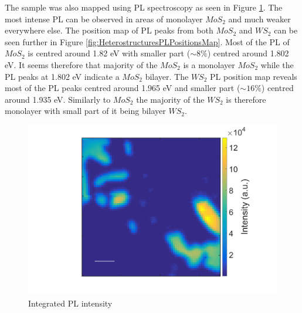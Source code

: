 The sample was also mapped using PL spectroscopy as seen in Figure \ref{fig:HeterostructuresPLIntensityMap11}. The most intense PL can be observed in areas of monolayer $MoS_2$ and much weaker everywhere else. The position map of PL peaks from both $MoS_2$ and $WS_2$ can be seen further in Figure \ref{fig:HeterostructuresPLPositionsMap}. Most of the PL of $MoS_2$ is centred around 1.82 eV with smaller part ($\sim 8 \%$) centred around 1.802 eV. It seems therefore that majority of the $MoS_2$ is a monolayer $MoS_2$ while the PL peaks at 1.802 eV indicate a $MoS_2$ bilayer. The $WS_2$ PL position map reveals most of the PL peaks centred around 1.965 eV and smaller part ($\sim 16 \%$) centred around 1.935 eV. Similarly to $MoS_2$ the majority of the $WS_2$ is therefore monolayer with small part of it being bilayer $WS_2$.

\begin{figure}[h]
	\begin{center}
		\includegraphics[scale=0.3]{Heterostructures/PLIntensityMap11.png}
		\caption{Integrated PL intensity}
		\label{fig:HeterostructuresPLIntensityMap11}
	\end{center}
\end{figure}

